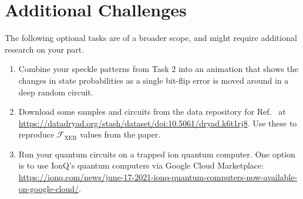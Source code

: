 \documentclass[12pt]{article}
\begin{document}
\section*{Additional Challenges}

The following optional tasks are of a broader scope, and might require additional research on your part.

\begin{enumerate}

\item Combine your speckle patterns from Task 2 into an animation that shows the changes in state probabilities as a single bit-flip error is moved around in a deep random circuit.

\item Download some samples and circuits from the data repository for Ref.~ at \url{https://datadryad.org/stash/dataset/doi:10.5061/dryad.k6t1rj8}.
Use these to reproduce $\mathcal{F}_\mathrm{XEB}$ values from the paper.

\item Run your quantum circuits on a trapped ion quantum computer.
One option is to use IonQ's quantum computers via Google Cloud Marketplace: \url{https://ionq.com/news/june-17-2021-ionq-quantum-computers-now-available-on-google-cloud/}.

\end{enumerate}



\end{document}
